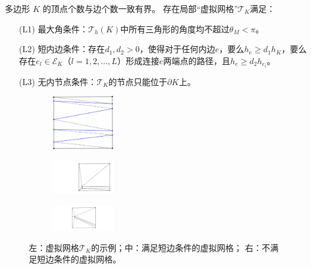 \documentclass[notheorems,serif]{beamer}
\begin{document}
\begin{frame}
    \begin{assumption}[虚拟网格假设]
\label{assump_vmesh}多边形 $K$ 的顶点个数与边个数一致有界。
存在局部“虚拟网格”$\mathcal{T}_K$满足：
\begin{itemize}
\item[(L1)] \label{asp:polygonL1} 最大角条件：$\mathcal T_h(K)$中所有三角形的角度均不超过$\theta_M< \pi$。
\item[(L2)] \label{asp:polygonL2} 短内边条件：存在$d_1, d_2 > 0$，使得对于任何内边$e$，要么$h_e \ge d_1 h_K$，要么存在$e_l\in\mathcal{E}_K$（$l=1,2,...,L$）形成连接$e$两端点的路径，且$h_e\ge d_2 h_{e_l}$。
\item[(L3)] \label{asp:polygonL3} 无内节点条件：$\mathcal{T}_K$的节点只能位于$\partial K$上。
\end{itemize}
\end{assumption}
\begin{figure}[htp]
\centering
\begin{subfigure}{.3\textwidth}
\centering
    \includegraphics[width=1.05in]{../figures/maxwell/submesh8}
\label{fig:submesh8}
\end{subfigure}
\begin{subfigure}{.3\textwidth}
\centering
    \includegraphics[width=1.05in]{../figures/maxwell/submesh6}
\label{fig:submesh4}
\end{subfigure}
\begin{subfigure}{.3\textwidth}
\centering
    \includegraphics[width=1.05in]{../figures/maxwell/submesh7}
\label{fig:submesh3}
\end{subfigure}
\caption{左：虚拟网格$\mathcal{T}_K$的示例；中：满足短边条件的虚拟网格；
右：不满足短边条件的虚拟网格。}
\end{figure}
\end{frame}
\end{document}
